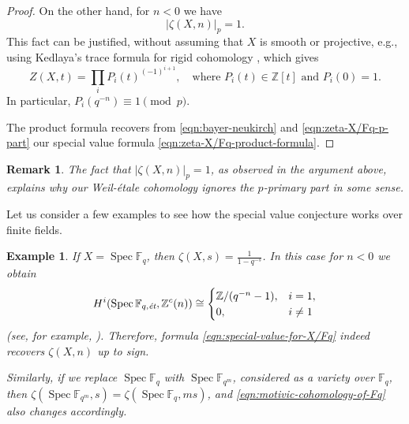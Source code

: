 \documentclass[10pt,a4paper,oneside]{article}
\DeclareMathOperator{\Spec}{Spec}
\newcommand{\FF}{\mathbb{F}}
\newcommand{\ZZ}{\mathbb{Z}}
\newcommand{\et}{\text{\it \'{e}t}}
\newcommand{\Wc}{\text{\it W,c}}
\theoremstyle{myplain}
\theoremstyle{mydefinition}
\newtheorem{remark}[theorem]{Remark}
\newtheorem{example}[theorem]{Example}
\numberwithin{equation}{section}
\begin{document}
\begin{proof}
  On the other hand, for $n < 0$ we have
  \begin{equation}
    \label{eqn:zeta-X/Fq-p-part}
    |\zeta (X,n)|_p = 1.
  \end{equation}
  This fact can be justified, without assuming that $X$ is smooth or projective,
  e.g., using Kedlaya's trace formula for rigid cohomology
  \cite[p.\,1446]{Kedlaya-2006}, which gives
  \[ Z (X,t) = \prod_i P_i (t)^{(-1)^{i+1}},
    \quad\text{where }
    P_i (t) \in \ZZ[t] \text{ and } P_i (0) = 1. \]
  In particular, $P_i (q^{-n}) \equiv 1 \pmod{p}$.

  The product formula recovers from \eqref{eqn:bayer-neukirch} and
  \eqref{eqn:zeta-X/Fq-p-part} our special value formula
  \eqref{eqn:zeta-X/Fq-product-formula}.
\end{proof}

\begin{remark}
  The fact that $|\zeta (X,n)|_p = 1$, as observed in the argument above,
  explains why our Weil-\'{e}tale cohomology ignores the $p$-primary part in
  some sense.
\end{remark}

Let us consider a few examples to see how the special value conjecture works
over finite fields.


\begin{example}
  \label{example:C(X,n)-for-Spec-Fq}
  If $X = \Spec \FF_q$, then $\zeta (X,s) = \frac{1}{1 - q^{-s}}$. In this case
  for $n < 0$ we obtain
  \begin{equation}
    \label{eqn:motivic-cohomology-of-Fq}
    H^i (\Spec \FF_{q,\et}, \ZZ^c (n)) \cong
    \begin{cases}
      \ZZ/(q^{-n} - 1), & i = 1, \\
      0, & i \ne 1
    \end{cases}
  \end{equation}
  (see, for example, \cite[Example~4.2]{Geisser-2017}). Therefore, formula
  \eqref{eqn:special-value-for-X/Fq} indeed recovers $\zeta (X,n)$ up to sign.

  Similarly, if we replace $\Spec \FF_q$ with $\Spec \FF_{q^m}$, considered as a
  variety over $\FF_q$, then
  $\zeta (\Spec \FF_{q^m},s) = \zeta (\Spec \FF_q, ms)$, and
  \eqref{eqn:motivic-cohomology-of-Fq} also changes accordingly.
\end{example}
\end{document}
